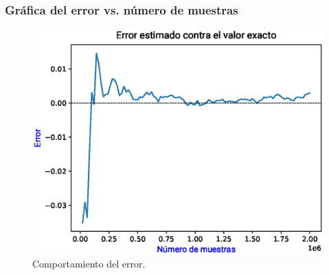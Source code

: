 \documentclass[12pt]{beamer}
\begin{document}
\begin{frame}
\frametitle{Gráfica del error vs. número de muestras}
\begin{figure}
    \centering
    \includegraphics[scale=0.55]{Imagenes/area_puntos_07_error.eps}
    \caption{Comportamiento del error.}
\end{figure}
\end{frame}
\end{document}
